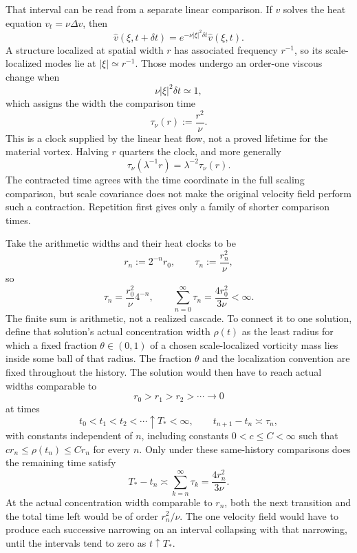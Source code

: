 That interval can be read from a separate linear comparison. If \(v\) solves the heat equation \(v_t=\nu\Delta v\), then
\[
  \widehat v(\xi,t+\delta t)
  =
  e^{-\nu|\xi|^2\delta t}\widehat v(\xi,t).
\]
A structure localized at spatial width \(r\) has associated frequency \(r^{-1}\), so its scale-localized modes lie at \(|\xi|\simeq r^{-1}\). Those modes undergo an order-one viscous change when
\[
  \nu|\xi|^2\delta t\simeq1,
\]
which assigns the width the comparison time
\[
  \tau_\nu(r)
  :=
  \frac{r^2}{\nu}.
\]
This is a clock supplied by the linear heat flow, not a proved lifetime for the material vortex. Halving \(r\) quarters the clock, and more generally
\[
  \tau_\nu(\lambda^{-1}r)
  =
  \lambda^{-2}\tau_\nu(r).
\]
The contracted time agrees with the time coordinate in the full scaling comparison, but scale covariance does not make the original velocity field perform such a contraction. Repetition first gives only a family of shorter comparison times.


Take the arithmetic widths and their heat clocks to be
\[
  r_n:=2^{-n}r_0,
  \qquad
  \tau_n:=\frac{r_n^2}{\nu},
\]
so
\[
  \tau_n
  =
  \frac{r_0^2}{\nu}4^{-n},
  \qquad
  \sum_{n=0}^{\infty}\tau_n
  =
  \frac{4r_0^2}{3\nu}
  <
  \infty.
\]
The finite sum is arithmetic, not a realized cascade. To connect it to one \NavierStokes{} solution, define that solution's actual concentration width \(\rho(t)\) as the least radius for which a fixed fraction \(\theta\in(0,1)\) of a chosen scale-localized vorticity mass lies inside some ball of that radius. The fraction \(\theta\) and the localization convention are fixed throughout the history. The solution would then have to reach actual widths comparable to
\[
  r_0>r_1>r_2>\cdots\longrightarrow0
\]
at times
\[
  t_0<t_1<t_2<\cdots\uparrow T_*<\infty,
  \qquad
  t_{n+1}-t_n\asymp\tau_n,
\]
with constants independent of \(n\), including constants \(0<c\leq C<\infty\) such that \(c r_n\leq\rho(t_n)\leq C r_n\) for every \(n\). Only under these same-history comparisons does the remaining time satisfy
\[
  T_*-t_n
  \asymp
  \sum_{k=n}^{\infty}\tau_k
  =
  \frac{4r_n^2}{3\nu}.
\]
At the actual concentration width comparable to \(r_n\), both the next transition and the total time left would be of order \(r_n^2/\nu\). The one velocity field would have to produce each successive narrowing on an interval collapsing with that narrowing, until the intervals tend to zero as \(t\uparrow T_*\).
